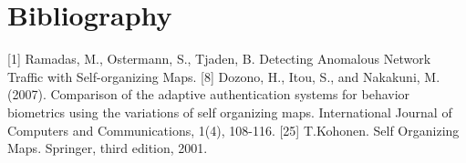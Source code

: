 \documentclass{article}
\begin{document}
\section{Bibliography} %
[1] Ramadas, M., Ostermann, S.,  Tjaden, B. Detecting Anomalous Network Traffic with Self-organizing Maps.
[8] Dozono, H., Itou, S., and Nakakuni, M. (2007). Comparison of the adaptive authentication systems for behavior biometrics using the variations of self organizing maps. International Journal of Computers and Communications, 1(4), 108-116.
[25] T.Kohonen. Self Organizing Maps. Springer, third edition, 2001.
\end{document}
